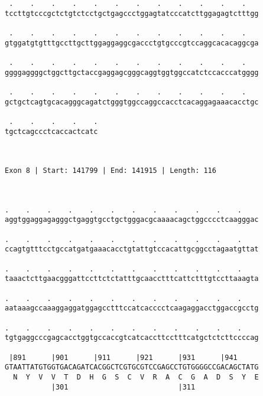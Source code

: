 \documentclass{article}
\begin{document}
\begin{Verbatim}
 .    .    .    .    .    .    .    .    .    .    .    .   
tccttgtcccgctctgtctcctgctgagccctggagtatcccatcttggagagtctttgg
                                                            
 .    .    .    .    .    .    .    .    .    .    .    .   
gtggatgtgtttgccttgcttggaggaggcgaccctgtgcccgtccaggcacacaggcga
                                                            
 .    .    .    .    .    .    .    .    .    .    .    .   
ggggaggggctggcttgctaccgaggagcgggcaggtggtggccatctccacccatgggg
                                                            
 .    .    .    .    .    .    .    .    .    .    .    .   
gctgctcagtgcacagggcagatctgggtggccaggccacctcacaggagaaacacctgc
                                                            
 .    .    .    .    .
tgctcagccctcaccactcatc
                      
                      
 
Exon 8 | Start: 141799 | End: 141915 | Length: 116



.    .    .    .    .    .    .    .    .    .    .    .    
aggtggaggagagggctgaggtgcctgctgggacgcaaaacagctggcccctcaagggac
                                                            
.    .    .    .    .    .    .    .    .    .    .    .    
ccagtgtttcctgccatgatgaaacacctgtattgtccacattgcggcctagaatgttat
                                                            
.    .    .    .    .    .    .    .    .    .    .    .    
taaactcttgaacgggattccttctctatttgcaacctttcattctttgtccttaaagta
                                                            
.    .    .    .    .    .    .    .    .    .    .    .    
aataaagccaaaggaggatggagcctttccatcacccctcaagaggacctggaccgcctg
                                                            
.    .    .    .    .    .    .    .    .    .    .    .    
tgtgaggcccgagcacctggtgccaccgtcatcaccttcctttcatgctctcttccccag
                                                            
 |891      |901      |911      |921      |931      |941     
GTAATTATGTGGTGACAGATCACGGCTCGTGCGTCCGAGCCTGTGGGGCCGACAGCTATG
  N  Y  V  V  T  D  H  G  S  C  V  R  A  C  G  A  D  S  Y  E
           |301                          |311               
  

\end{Verbatim}
\end{document}
